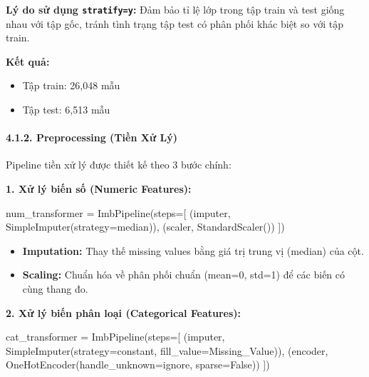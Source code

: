 \documentclass[
]{article}
\newenvironment{Shaded}{}{}
\newcommand{\NormalTok}[1]{#1}
\newcommand{\OperatorTok}[1]{\textcolor[rgb]{0.40,0.40,0.40}{#1}}
\newcommand{\StringTok}[1]{\textcolor[rgb]{0.25,0.44,0.63}{#1}}
\newcommand{\VariableTok}[1]{\textcolor[rgb]{0.10,0.09,0.49}{#1}}
\providecommand{\tightlist}{%
  \setlength{\itemsep}{0pt}\setlength{\parskip}{0pt}}
\begin{document}
\textbf{Lý do sử dụng \texttt{stratify=y}:} Đảm bảo tỉ lệ lớp trong tập
train và test giống nhau với tập gốc, tránh tình trạng tập test có phân
phối khác biệt so với tập train.

\textbf{Kết quả:}

\begin{itemize}
\tightlist
\item
  Tập train: 26,048 mẫu
\item
  Tập test: 6,513 mẫu
\end{itemize}

\paragraph{4.1.2. Preprocessing (Tiền Xử
Lý)}\label{412-preprocessing-tiux1ec1n-xux1eed-luxfd}

Pipeline tiền xử lý được thiết kế theo 3 bước chính:

\textbf{1. Xử lý biến số (Numeric Features):}

\begin{Shaded}
\begin{Highlighting}[]
\NormalTok{num\_transformer }\OperatorTok{=}\NormalTok{ ImbPipeline(steps}\OperatorTok{=}\NormalTok{[}
\NormalTok{    (}\StringTok{\textquotesingle{}imputer\textquotesingle{}}\NormalTok{, SimpleImputer(strategy}\OperatorTok{=}\StringTok{\textquotesingle{}median\textquotesingle{}}\NormalTok{)),}
\NormalTok{    (}\StringTok{\textquotesingle{}scaler\textquotesingle{}}\NormalTok{, StandardScaler())}
\NormalTok{])}
\end{Highlighting}
\end{Shaded}

\begin{itemize}
\tightlist
\item
  \textbf{Imputation:} Thay thế missing values bằng giá trị trung vị
  (median) của cột.
\item
  \textbf{Scaling:} Chuẩn hóa về phân phối chuẩn (mean=0, std=1) để các
  biến có cùng thang đo.
\end{itemize}

\textbf{2. Xử lý biến phân loại (Categorical Features):}

\begin{Shaded}
\begin{Highlighting}[]
\NormalTok{cat\_transformer }\OperatorTok{=}\NormalTok{ ImbPipeline(steps}\OperatorTok{=}\NormalTok{[}
\NormalTok{    (}\StringTok{\textquotesingle{}imputer\textquotesingle{}}\NormalTok{, SimpleImputer(strategy}\OperatorTok{=}\StringTok{\textquotesingle{}constant\textquotesingle{}}\NormalTok{, fill\_value}\OperatorTok{=}\StringTok{\textquotesingle{}Missing\_Value\textquotesingle{}}\NormalTok{)),}
\NormalTok{    (}\StringTok{\textquotesingle{}encoder\textquotesingle{}}\NormalTok{, OneHotEncoder(handle\_unknown}\OperatorTok{=}\StringTok{\textquotesingle{}ignore\textquotesingle{}}\NormalTok{, sparse}\OperatorTok{=}\VariableTok{False}\NormalTok{))}
\NormalTok{])}
\end{Highlighting}
\end{Shaded}
\end{document}
